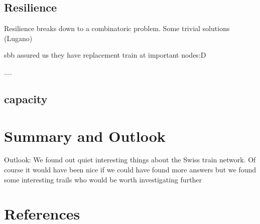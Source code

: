 \documentclass[11pt]{article}
\begin{document}
\subsection{Resilience}
 Resilience breaks down to a combinatoric problem. Some trivial solutions (Lugano)
 
 sbb assured us they have replacement train at important nodes:D

....

\subsection{capacity}






\section{Summary and Outlook}

Outlook:
We found out quiet interesting things about the Swiss train network. Of course it would have been nice if we could have found more answers but we found some interesting trails who would be worth investigating further

\section{References}
\end{document}

